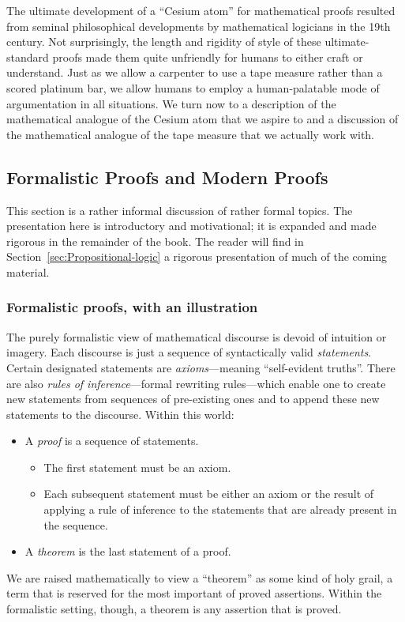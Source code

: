 The ultimate development of a ``Cesium atom'' for mathematical proofs
resulted from seminal philosophical developments by mathematical
logicians in the 19th century.  Not surprisingly, the length and
rigidity of style of these ultimate-standard proofs made them quite
unfriendly for humans to either craft or understand.  Just as we allow
a carpenter to use a tape measure rather than a scored platinum bar,
we allow humans to employ a human-palatable mode of argumentation in
all situations.  We turn now to a description of the mathematical
analogue of the Cesium atom that we aspire to and a discussion of the
mathematical analogue of the tape measure that we actually work with.


\subsection{Formalistic Proofs and Modern Proofs}
\label{sec:classical-v-modern-proofs}

This section is a rather informal discussion of rather formal topics.
The presentation here is introductory and motivational; it is expanded
and made rigorous in the remainder of the book.  The reader will find
in Section~\ref{sec:Propositional-logic} a rigorous presentation of
much of the coming material.


\subsubsection{Formalistic proofs, with an illustration}
\label{sec:formal-proof}

The purely formalistic view of mathematical discourse is devoid of
intuition or imagery.  Each discourse is just a sequence of
syntactically valid {\it statements}.  Certain designated statements
are {\em axioms}---meaning ``self-evident truths''.  There are also
{\em rules of inference}---formal rewriting rules---which enable one
to create new statements from sequences of pre-existing ones and to
append these new statements to the discourse.  Within this world:
\begin{itemize}
\item
A {\em proof} is a sequence of statements.
  \begin{itemize}
  \item
The first statement must be an axiom.
  \item
Each subsequent statement must be either an axiom or the result of
applying a rule of inference to the statements that are already
present in the sequence.
  \end{itemize}
\item
A {\em theorem} is the last statement of a proof.
\end{itemize}
We are raised mathematically to view a ``theorem'' as some kind of
holy grail, a term that is reserved for the most important of proved
assertions.  Within the formalistic setting, though, a theorem is any
assertion that is proved.

